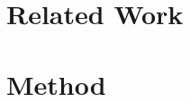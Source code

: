 \documentclass[10pt,twocolumn,letterpaper]{article}
\begin{document}




\section{Related Work}
\label{sec:relatedwork}


\section{Method}
\label{sec:method}
\end{document}
